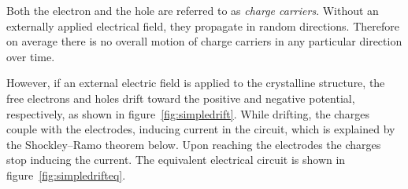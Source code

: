 Both the electron and the hole are referred to as \emph{charge carriers}. Without an externally applied electrical field, they propagate in random directions. Therefore on average there is no overall motion of charge carriers in any particular direction over time.

However, if an external electric field is applied to the crystalline structure, the free electrons and holes drift toward the positive and negative potential, respectively, as shown in figure~\ref{fig:simpledrift}. While drifting, the charges couple with the electrodes, inducing current in the circuit, which is explained by the Shockley--Ramo theorem below. Upon reaching the electrodes the charges stop inducing the current. The equivalent electrical circuit is shown in figure~\ref{fig:simpledrifteq}.






